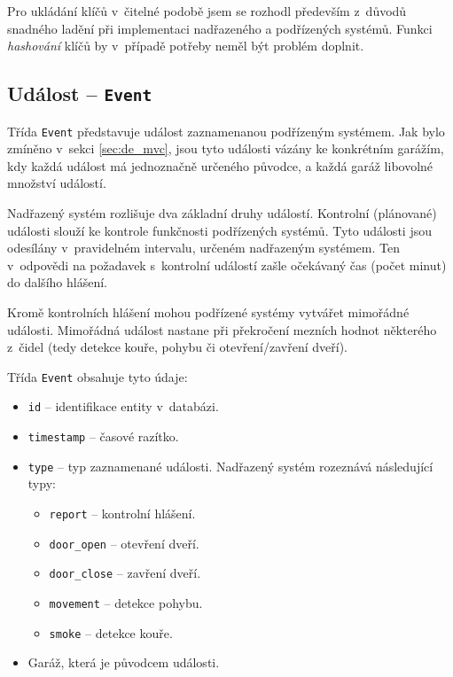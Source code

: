 Pro ukládání klíčů v~čitelné podobě jsem se rozhodl především z~důvodů snadného ladění při implementaci nadřazeného a podřízených systémů. Funkci \textit{hashování} klíčů by v~případě potřeby neměl být problém doplnit.

\subsection{Událost -- \texttt{Event}}
\label{sec:de_event}

Třída \texttt{Event} představuje událost zaznamenanou podřízeným systémem. Jak bylo zmíněno v~sekci \ref{sec:de_mvc}, jsou tyto události vázány ke konkrétním garážím, kdy každá událost má jednoznačně určeného původce, a každá garáž libovolné množství událostí.

Nadřazený systém rozlišuje dva základní druhy událostí. Kontrolní (plánované) události slouží ke kontrole funkčnosti podřízených systémů. Tyto události jsou odesílány v~pravidelném intervalu, určeném nadřazeným systémem. Ten v~odpovědi na požadavek s~kontrolní událostí zašle očekávaný čas (počet minut) do dalšího hlášení.

Kromě kontrolních hlášení mohou podřízené systémy vytvářet mimořádné události. Mimořádná událost nastane při překročení mezních hodnot některého z~čidel (tedy detekce kouře, pohybu či otevření/zavření dveří).

Třída \texttt{Event} obsahuje tyto údaje:

\begin{itemize}
    \item \texttt{id} -- identifikace entity v~databázi.
    \item \texttt{timestamp} -- časové razítko.
    \item \texttt{type} -- typ zaznamenané události. Nadřazený systém rozeznává následující typy:
    \begin{itemize}
        \item \texttt{report} -- kontrolní hlášení.
        \item \texttt{door\_open} -- otevření dveří.
        \item \texttt{door\_close} -- zavření dveří.
        \item \texttt{movement} -- detekce pohybu.
        \item \texttt{smoke} -- detekce kouře.
    \end{itemize}
    \item Garáž, která je původcem události.
\end{itemize}

